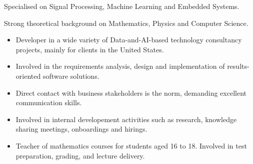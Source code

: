 \documentclass[10pt,a4paper,ragged2e,withhyper]{altacv}
\begin{document}
\begin{paracol}{2}





Specialised on Signal Processing, Machine Learning and Embedded Systems.

\smallskip
Strong theoretical background on Mathematics, Physics and Computer Science.




\begin{itemize}
    \item Developer in a wide variety of  Data-and-AI-based technology consultancy projects, mainly for clients in the United States. 
    \item Involved in the requirements analysis, design and implementation of results-oriented software solutions. 
    \item Direct contact with business stakeholders is the norm, demanding excellent communication skills.
    \item Involved in internal developement activities such as research, knowledge sharing meetings, onboardings and hirings.
\end{itemize}

\smallskip

\begin{itemize}
    \item Teacher of mathematics courses for students aged 16 to 18. Involved in test preparation, grading, and lecture delivery.
\end{itemize}

\smallskip

\begin{itemize}


\end{itemize}
\end{paracol}
\end{document}
